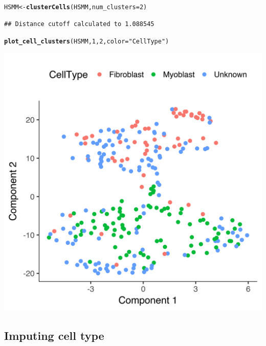 \documentclass[10pt,oneside]{article}\usepackage[]{graphicx}\usepackage[]{color}
\makeatletter
\def\maxwidth{ %
  \ifdim\Gin@nat@width>\linewidth
    \linewidth
  \else
    \Gin@nat@width
  \fi
}
\newcommand{\hlnum}[1]{\textcolor[rgb]{0.686,0.059,0.569}{#1}}%
\newcommand{\hlstr}[1]{\textcolor[rgb]{0.192,0.494,0.8}{#1}}%
\newcommand{\hlstd}[1]{\textcolor[rgb]{0.345,0.345,0.345}{#1}}%
\newcommand{\hlkwb}[1]{\textcolor[rgb]{0.69,0.353,0.396}{#1}}%
\newcommand{\hlkwc}[1]{\textcolor[rgb]{0.333,0.667,0.333}{#1}}%
\newcommand{\hlkwd}[1]{\textcolor[rgb]{0.737,0.353,0.396}{\textbf{#1}}}%
\newenvironment{kframe}{%
 \def\at@end@of@kframe{}%
 \ifinner\ifhmode%
  \def\at@end@of@kframe{\end{minipage}}%
  \begin{minipage}{\columnwidth}%
 \fi\fi%
 \def\FrameCommand##1{\hskip\@totalleftmargin \hskip-\fboxsep
 \colorbox{shadecolor}{##1}\hskip-\fboxsep
     \hskip-\linewidth \hskip-\@totalleftmargin \hskip\columnwidth}%
 \MakeFramed {\advance\hsize-\width
   \@totalleftmargin\z@ \linewidth\hsize
   \@setminipage}}%
 {\par\unskip\endMakeFramed%
 \at@end@of@kframe}
\newenvironment{knitrout}{}{} %
\makeatother
\begin{document}
\begin{knitrout}
\begin{kframe}
{\ttfamily\noindent\itshape\color{messagecolor}{\#\# Remove noise by PCA ...}}

{\ttfamily\noindent\itshape\color{messagecolor}{\#\# Reduce dimension by tSNE ...}}\begin{alltt}
\hlstd{HSMM} \hlkwb{<-} \hlkwd{clusterCells}\hlstd{(HSMM,} \hlkwc{num_clusters}\hlstd{=}\hlnum{2}\hlstd{)}
\end{alltt}
\begin{verbatim}
## Distance cutoff calculated to 1.088545
\end{verbatim}


{\ttfamily\noindent\itshape\color{messagecolor}{\#\# the length of the distance: 34191}}\begin{alltt}
\hlkwd{plot_cell_clusters}\hlstd{(HSMM,} \hlnum{1}\hlstd{,} \hlnum{2}\hlstd{,} \hlkwc{color}\hlstd{=}\hlstr{"CellType"}\hlstd{)}
\end{alltt}
\end{kframe}

{\centering \includegraphics[width=\maxwidth]{figure/cluster_cells_semisup_clustering_no_impute-2} 

}



\end{knitrout}
 
 \subsection{Imputing cell type}
 
\end{document}
